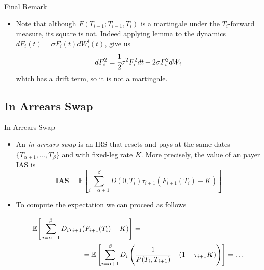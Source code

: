 \documentclass{beamer}
\begin{document}
\begin{frame}{Final Remark}
\begin{itemize}
\item Note that although $F(T_{i-1};T_{i-1},T_i)$ is a martingale under the $T_i$-forward measure, its square is not. Indeed applying \ito lemma to the dynamics $dF_i(t) = \sigma F_i(t)dW^i_i(t)$, give us
\begin{equation*}
dF_i^2=\cfrac{1}{2}\sigma^2F_i^2dt+2\sigma F_i^2dW_i
\end{equation*}
which has a drift term, so it is not a martingale.
\end{itemize}
\end{frame}

\subsection{In Arrears Swap}
\begin{frame}{In-Arrears Swap}
\begin{itemize}
\item An \emph{in-arrears swap} is an IRS that resets and pays at the same dates $\{T_{\alpha+1},\ldots, T_\beta\}$ and with fixed-leg rate $K$. More precisely, the value of an payer IAS is
\begin{equation}
\textbf{IAS}=\mathbb{E}\left[\sum_{i=\alpha+1}^{\beta}D(0,T_i)\tau_{i+1}(F_{i+1}(T_i)-K)\right]
\end{equation}
\item To compute the expectation we can proceed as follows

\begin{equation*}
\begin{aligned}
\mathbb{E}\Bigg[\sum_{i=\alpha+1}^{\beta}D_i\tau_{i+1}&(F_{i+1}(T_i)-K)\Bigg] = \\ 
&=\mathbb{E}\left[\sum_{i=\alpha+1}^{\beta}D_i\left(\cfrac{1}{P(T_i,T_{i+1})}-(1+\tau_{i+1}K)\right)\right]=\ldots
\end{aligned}
\end{equation*}
\end{itemize}
\end{frame}
\end{document}
